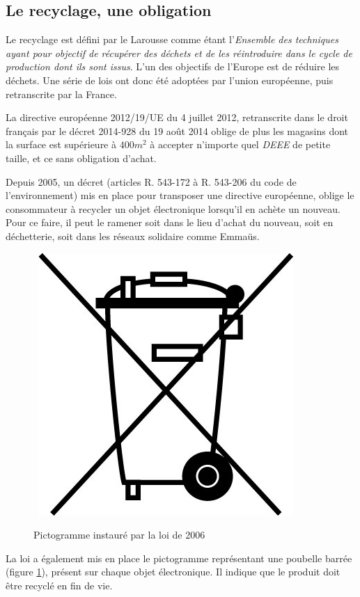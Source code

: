 \subsection{Le recyclage, une obligation}

Le recyclage est défini par le Larousse  comme étant l'\og{}\textit{Ensemble des techniques ayant pour objectif de récupérer des déchets et de les réintroduire dans le cycle de production dont ils sont issus}\fg{}. L'un des objectifs de l'Europe est de réduire les déchets. Une série de lois ont donc été adoptées par l'union européenne, puis retranscrite par la France. 

La directive européenne 2012/19/UE du 4 juillet 2012, retranscrite dans le droit français par le décret 2014-928 du 19 août 2014 oblige de plus les magasins dont la surface est supérieure à $400m^2$ à accepter n'importe quel \textit{DEEE} de petite taille, et ce sans obligation d'achat. 

Depuis 2005, un décret (articles R. 543-172 à R. 543-206 du code de l'environnement) mis en place pour transposer une directive européenne, oblige le consommateur à recycler un objet électronique lorsqu'il en achète un nouveau. Pour ce faire, il peut le ramener soit dans le lieu d'achat du nouveau, soit en déchetterie, soit dans les réseaux solidaire comme Emmaüs.

\begin{figure}
~\includegraphics[scale=0.33]{Rsc/pictopoubellebarree.jpg} 
\caption{Pictogramme instauré par la loi de 2006}
\label{fig::picPoubelleBarree}
\end{figure} 
La loi a également mis en place le pictogramme représentant une poubelle barrée (figure \ref{fig::picPoubelleBarree}), présent sur chaque objet électronique. Il indique que le produit doit être recyclé en fin de vie. 

